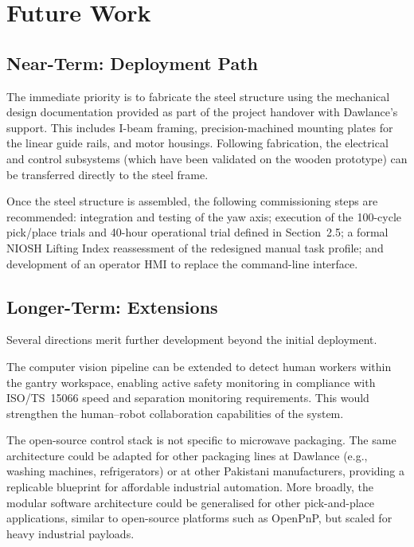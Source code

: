 \section{Future Work} 

\subsection{Near-Term: Deployment Path} \label{sec:near_term}

The immediate priority is to fabricate the steel structure using the mechanical design documentation provided as part of the project handover with Dawlance's support. This includes I-beam framing, precision-machined mounting plates for the linear guide rails, and motor housings. Following fabrication, the electrical and control subsystems (which have been validated on the wooden prototype) can be transferred directly to the steel frame.

Once the steel structure is assembled, the following commissioning steps are recommended: integration and testing of the yaw axis; execution of the 100-cycle pick/place trials and 40-hour operational trial defined in Section~2.5; a formal NIOSH Lifting Index reassessment of the redesigned manual task profile; and development of an operator HMI to replace the command-line interface.

\subsection{Longer-Term: Extensions}

Several directions merit further development beyond the initial deployment.

The computer vision pipeline can be extended to detect human workers within the gantry workspace, enabling active safety monitoring in compliance with ISO/TS~15066 speed and separation monitoring requirements. This would strengthen the human--robot collaboration capabilities of the system.

The open-source control stack is not specific to microwave packaging. The same architecture could be adapted for other packaging lines at Dawlance (e.g., washing machines, refrigerators) or at other Pakistani manufacturers, providing a replicable blueprint for affordable industrial automation. More broadly, the modular software architecture could be generalised for other pick-and-place applications, similar to open-source platforms such as OpenPnP, but scaled for heavy industrial payloads.

